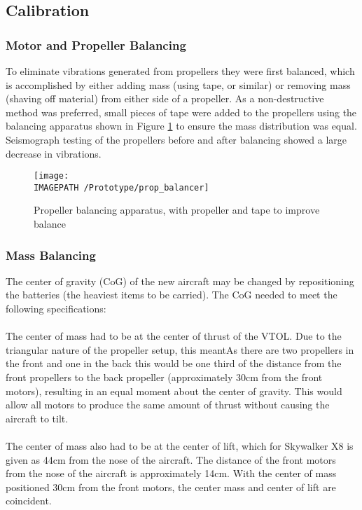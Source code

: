 \subsection{Calibration}
\subsubsection*{Motor and Propeller Balancing}
To eliminate vibrations generated from propellers they were first balanced, which is accomplished by either adding mass (using tape, or similar) or removing mass (shaving off material) from either side of a propeller. As a non-destructive method was preferred, small pieces of tape were added to the propellers using the balancing apparatus shown in Figure \ref{fig:propbalancing} to ensure the mass distribution was equal.  Seismograph testing of the propellers before and after balancing showed a large decrease in vibrations.
\begin{figure}[!ht]
	\centering
	\texttt{[image: \\IMAGEPATH /Prototype/prop\_balancer]}
	\caption{Propeller balancing apparatus, with propeller and tape to improve balance}
	\label{fig:propbalancing}
\end{figure}

\subsubsection*{Mass Balancing}
The center of gravity (CoG) of the new aircraft may be changed by repositioning the batteries (the heaviest items to be carried). The CoG needed to meet the following specifications:
	\\\\The center of mass had to be at the center of thrust of the VTOL. Due to the triangular nature of the propeller setup, this meantAs there are two propellers in the front and one in the back this would be one third of the distance from the front propellers to the back propeller (approximately 30cm from the front motors), resulting in an equal moment about the center of gravity. This would allow all motors to produce the same amount of thrust without causing the aircraft to tilt.
	\\\\The center of mass also had to be at the center of lift, which for Skywalker X8 is given as 44cm from the nose of the aircraft. The distance of the front motors from the nose of the aircraft is approximately 14cm. With the center of mass positioned 30cm from the front motors, the center mass and center of lift are coincident.
	
